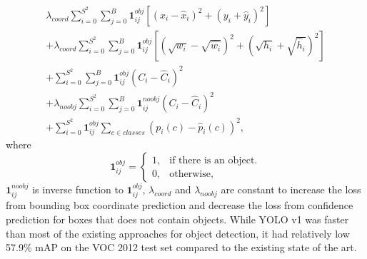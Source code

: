 \documentclass[twoside]{ctuthesis}
\theoremstyle{plain}
\theoremstyle{definition}
\theoremstyle{note}
\begin{document}
\begin{multline}
\lambda_{coord}\sum_{i=0}^{S^2}\sum_{j=0}^{B}\textbf{1}_{ij}^{obj}\left[\left(x_i - \hat{x}_i\right)^2+\left(y_i + \hat{y}_i\right)^2\right]\\
+\lambda_{coord}\sum_{i=0}^{S^2}\sum_{j=0}^{B}\textbf{1}_{ij}^{obj}\left[\left(\sqrt{w_i} - \sqrt{\hat{w_i}}\right)^2+\left(\sqrt{h_i} + \sqrt{\hat{h}_i}\right)^2\right]\\
+\sum_{i=0}^{S^2}\sum_{j=0}^{B}\textbf{1}_{ij}^{obj}\left(C_i-\hat{C}_i\right)^2\\
+\lambda_{noobj}\sum_{i=0}^{S^2}\sum_{j=0}^{B}\textbf{1}_{ij}^{noobj}\left(C_i-\hat{C}_i\right)^2\\
+\sum_{i=0}^{S^2}\textbf{1}_{ij}^{obj}\sum_{c\in classes}\left(p_i(c) - \hat{p}_i(c)\right)^2,
\end{multline}
where 
\begin{equation}
  \textbf{1}_{ij}^{obj}=\begin{cases}
    1, & \text{if there is an object}.\\
    0, & \text{otherwise},
  \end{cases}
\end{equation}
$\textbf{1}_{ij}^{noobj}$ is inverse function to $\textbf{1}_{ij}^{obj}$, $\lambda_{coord}$ and $\lambda_{noobj}$ are constant to increase the loss from bounding box coordinate prediction and decrease the loss from confidence prediction for boxes that does not contain objects. 
While YOLO v1 was faster than most of the existing approaches for object detection, it had relatively low 57.9\% mAP on the VOC 2012 test set compared to the existing state of the art. 
\end{document}
